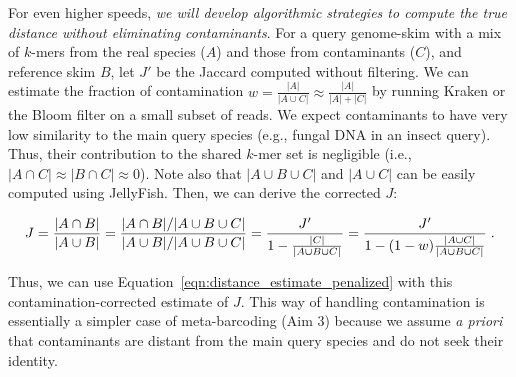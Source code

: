For even higher speeds, {\em we will develop algorithmic strategies to
  compute the true distance without eliminating contaminants}.  For a
query genome-skim with a mix of $k$-mers from the real species ($A$)
and those from contaminants ($C$), and reference skim $B$, let $J'$ be
the Jaccard computed without filtering.  We can estimate the fraction
of contamination $w=\frac{|A|}{|A\cup C|}\approx\frac{|A|}{|A|+|C|}$
by running Kraken or the Bloom filter on a small subset of reads.  We
expect contaminants to have very low similarity to the main query
species (e.g., fungal DNA in an insect query). Thus, their
contribution to the shared $k$-mer set is negligible (i.e., $|A\cap
C|\approx |B\cap C|\approx 0$).  Note also that $|A\cup B \cup C|$ and
$|A\cup C|$ can be easily computed using JellyFish.  Then, we can
derive the corrected $J$:
\vspace{-6pt}
\begin{small}
$$J=\frac{|A\cap B|}{|A\cup B|}=\frac{|A\cap B|/{|A\cup B \cup C|}}{|A\cup B|/|A\cup B \cup C|}=\frac{J'}{1-\frac{|C|}{|A\cup B \cup C|}}=\frac{J'}{1-(1-w)\frac{|A\cup C|}{|A\cup B \cup C|}}\; .
\vspace{-3pt}
$$
\end{small}
Thus, we can use Equation~\ref{eqn:distance_estimate_penalized} with
this contamination-corrected estimate of $J$.  This way of handling
contamination is essentially a simpler case of meta-barcoding (Aim 3)
because we assume {\em a priori} that contaminants are distant from
the main query species and do not seek their identity.

\vspace{-5pt}

